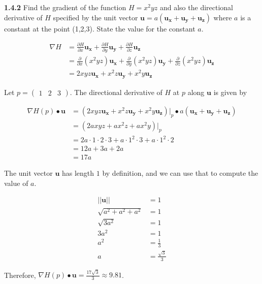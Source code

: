 \documentclass{article}
\begin{document}
\textbf{1.4.2} Find the gradient of the function $H = x^2 yz$ and also the directional derivative of $H$ specified by
the unit vector $\mathbf{u} = a(\mathbf{u_x} + \mathbf{u_y} + \mathbf{u_z})$ where $a$ is a constant at the point
(1,2,3). State the value for the constant $a$.

\begin{equation*}
	\begin{split}
		\nabla H & = \frac{\partial H}{\partial x}\mathbf{u_x} + \frac{\partial H}{\partial y}\mathbf{u_y} + \frac{\partial H}{\partial z}\mathbf{u_z} \\
		& = \frac{\partial}{\partial x}(x^2 yz)\mathbf{u_x} + \frac{\partial}{\partial y}(x^2 yz)\mathbf{u_y} + \frac{\partial}{\partial z}(x^2 yz)\mathbf{u_z} \\
		& = 2xyz\mathbf{u_x} + x^2 z\mathbf{u_y} + x^2 y\mathbf{u_z}
	\end{split}
\end{equation*}

Let $p = \begin{pmatrix} 1 & 2 & 3 \end{pmatrix}$. The directional derivative of $H$ at $p$ along $\mathbf{u}$ is given
by

\begin{equation*}
	\begin{split}
		\nabla H(p) \bullet \mathbf{u} & = (2xyz\mathbf{u_x} + x^2 z\mathbf{u_y} + x^2 y\mathbf{u_z})\rvert_{p} \bullet a(\mathbf{u_x} + \mathbf{u_y} + \mathbf{u_z}) \\
		& = (2axyz + ax^2 z + ax^2 y)\rvert_{p} \\
		& = 2a \cdot 1 \cdot 2 \cdot 3 + a \cdot 1^2 \cdot 3 + a \cdot 1^2 \cdot 2 \\
		& = 12a + 3a + 2a \\
		& = 17a
	\end{split}
\end{equation*}

The unit vector $\mathbf{u}$ has length $1$ by definition, and we can use that to compute the value of $a$.

\begin{equation*}
	\begin{split}
		||\mathbf{u}|| & = 1 \\
		\sqrt{a^2 + a^2 + a^2} & = 1 \\
		\sqrt{3a^2} & = 1 \\
		3a^2 & = 1 \\
		a^2 & = \frac{1}{3} \\
		a & = \frac{\sqrt{3}}{3}
	\end{split}
\end{equation*}

Therefore, $\nabla H(p) \bullet \mathbf{u} = \frac{17\sqrt{3}}{3} \approx 9.81$.
\end{document}
